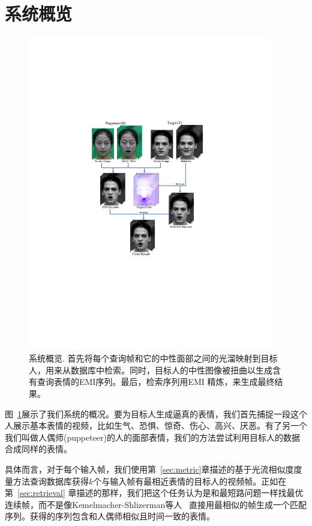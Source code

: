 \section{系统概览}
\renewcommand{\figurename}{图}
\begin{figure}[htbp]
\centering
    \includegraphics[width=0.95\textwidth]{data/img/overview.pdf}
    \caption{系统概览. 首先将每个查询帧和它的中性面部之间的光溜映射到目标人，用来从数据库中检索。同时，目标人的中性图像被扭曲以生成含有查询表情的EMI序列。最后，检索序列用EMI 精炼，来生成最终结果。}
    \label{fig:overview}
\end{figure}
图~\ref{fig:overview}展示了我们系统的概况。要为目标人生成逼真的表情，我们首先捕捉一段这个人展示基本表情的视频，比如生气、恐惧、惊奇、伤心、高兴、厌恶。有了另一个我们叫做人偶师(puppeteer)的人的面部表情，我们的方法尝试利用目标人的数据合成同样的表情。

具体而言，对于每个输入帧，我们使用第~\ref{sec:metric}章描述的基于光流相似度度量方法查询数据库获得$k$个与输入帧有最相近表情的目标人的视频帧。正如在第~\ref{sec:retrieval} 章描述的那样，我们把这个任务认为是和最短路问题一样找最优连续帧，而不是像Kemelmacher-Shlizerman等人~\cite{eccv10} 直接用最相似的帧生成一个匹配序列。获得的序列包含和人偶师相似且时间一致的表情。

